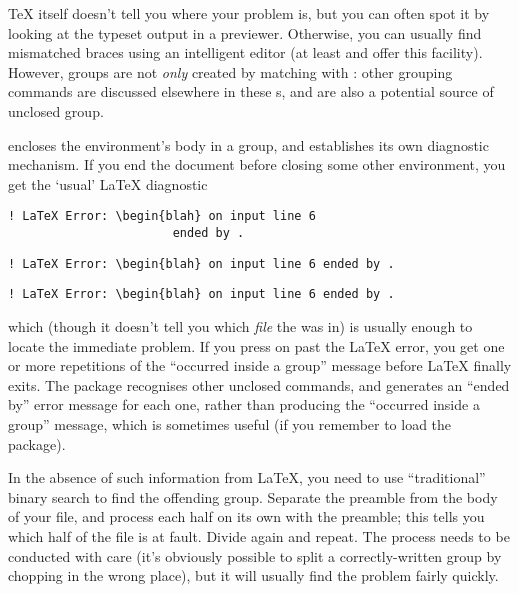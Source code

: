 \TeX{} itself doesn't tell you where your problem is, but you can
often spot it by looking at the typeset output in a previewer.
Otherwise, you can usually find mismatched braces using an intelligent
editor (at least  and  offer this facility).
However, groups are not \emph{only} created by matching
\texttt{\obracesymbol{}} with \texttt{\cbracesymbol{}}:
other grouping commands are discussed elsewhere in these s,
and are also a potential source of unclosed group.

 encloses the environment's body
in a group, and establishes its own diagnostic mechanism.  If you end
the document before closing some other environment, you get the
`usual' \LaTeX{} diagnostic
\htmlignore
\begin{dviversion}
\begin{verbatim}
! LaTeX Error: \begin{blah} on input line 6
                       ended by .
\end{verbatim}
\end{dviversion}
\begin{pdfversion}
\begin{verbatim}
! LaTeX Error: \begin{blah} on input line 6 ended by .
\end{verbatim}
\end{pdfversion}
\endhtmlignore
\begin{htmlversion}
\begin{verbatim}
! LaTeX Error: \begin{blah} on input line 6 ended by .
\end{verbatim}
\end{htmlversion}
which (though it doesn't tell you which \emph{file} the
 was in) is usually enough to locate the
immediate problem.  If you press on past the \LaTeX{} error, you get
one or more repetitions of the ``occurred inside a group'' message
before \LaTeX{} finally exits.  The  package
recognises other unclosed  commands, and
generates an ``ended by'' error message for each one, rather than
producing the ``occurred inside a group'' message, which is sometimes
useful (if you remember to load the package).

In the absence of such information from \LaTeX{}, you need to use
``traditional'' binary search to find the offending group.  Separate
the preamble from the body of your file, and process each half on its
own with the preamble; this tells you which half of the file is at
fault.  Divide again and repeat.  The process needs to be conducted
with care (it's obviously possible to split a correctly-written group
by chopping in the wrong place), but it will usually find the problem
fairly quickly.

